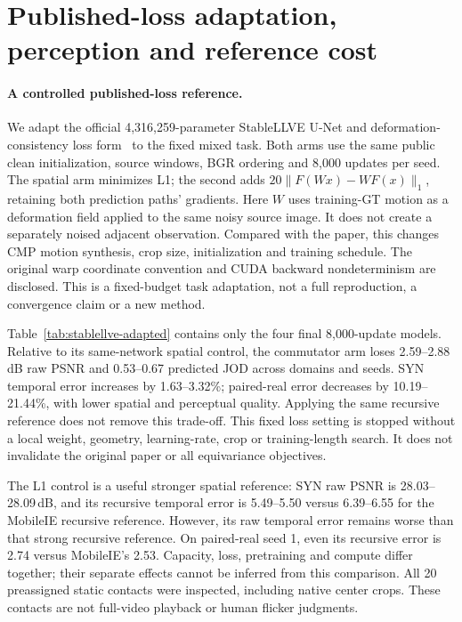 \section{Published-loss adaptation, perception and reference cost}
\label{sec:video-evidence}
\paragraph{A controlled published-loss reference.}
We adapt the official 4,316,259-parameter StableLLVE U-Net
and deformation-consistency loss form~\cite{stablellve} to the fixed mixed
task. Both arms use the same public clean initialization, source windows,
BGR ordering and 8,000 updates per seed. The spatial arm minimizes L1;
the second adds $20\lVert F(Wx)-WF(x)\rVert_1$, retaining both prediction
paths' gradients. Here $W$ uses training-GT motion as a deformation field
applied to the same noisy source image. It does not create a separately
noised adjacent observation. Compared with the paper, this changes CMP
motion synthesis, crop size, initialization and training schedule. The
original warp coordinate convention and CUDA backward nondeterminism
are disclosed. This is a fixed-budget task adaptation, not a full
reproduction, a convergence claim or a new method.


Table~\ref{tab:stablellve-adapted} contains only the four final 8,000-update
models. Relative to its same-network spatial control, the commutator arm
loses 2.59--2.88\,dB raw PSNR and 0.53--0.67 predicted JOD across domains
and seeds. SYN temporal error increases by 1.63--3.32\%; paired-real
error decreases by 10.19--21.44\%, with lower spatial and perceptual
quality. Applying the same recursive reference does not remove this
trade-off. This fixed loss setting is stopped without a local weight,
geometry, learning-rate, crop or training-length search. It does not
invalidate the original paper or all equivariance objectives.

The L1 control is a useful stronger spatial reference: SYN raw PSNR is
28.03--28.09\,dB, and its recursive temporal error is 5.49--5.50 versus
6.39--6.55 for the MobileIE recursive reference. However, its raw temporal
error remains worse than that strong recursive reference. On paired-real
seed 1, even its recursive error is 2.74 versus MobileIE's 2.53. Capacity,
loss, pretraining and compute differ together; their separate effects
cannot be inferred from this comparison. All 20 preassigned static
contacts were inspected, including native center crops. These contacts
are not full-video playback or human flicker judgments.

